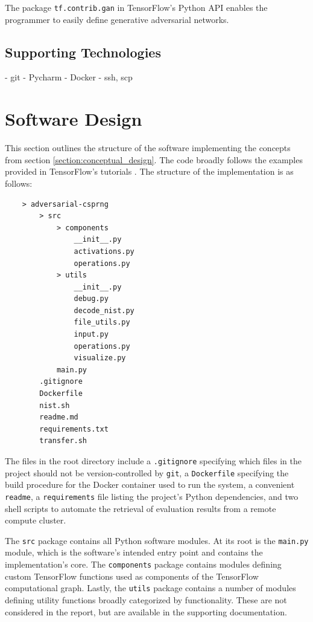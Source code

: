\documentclass[12pt, titlepage]{report}
\theoremstyle{definition}
\begin{document}
The package \texttt{tf.contrib.gan} in TensorFlow's Python API enables the programmer to easily define generative adversarial networks.



\subsection{Supporting Technologies}
- git
- Pycharm
- Docker
- ssh, scp




\section{Software Design}
This section outlines the structure of the software implementing the concepts from section \ref{section:conceptual_design}. The code broadly follows the examples provided in TensorFlow's tutorials \cite{tensorflow2018tutorials} \cite{tensorflow2018tfgan}. The structure of the implementation is as follows:

\begin{verbatim}
    > adversarial-csprng    
        > src
            > components
                __init__.py
                activations.py
                operations.py
            > utils
                __init__.py
                debug.py
                decode_nist.py
                file_utils.py
                input.py
                operations.py
                visualize.py
            main.py
        .gitignore
        Dockerfile
        nist.sh
        readme.md
        requirements.txt
        transfer.sh
\end{verbatim}

The files in the root directory include a \texttt{.gitignore} specifying which files in the project should not be version-controlled by \texttt{git}, a \texttt{Dockerfile} specifying the build procedure for the Docker container used to run the system, a convenient \texttt{readme}, a \texttt{requirements} file listing the project's Python dependencies, and two shell scripts to automate the retrieval of evaluation results from a remote compute cluster.

The \texttt{src} package contains all Python software modules. At its root is the \texttt{main.py} module, which is the software's intended entry point and contains the implementation's core. The \texttt{components} package contains modules defining custom TensorFlow functions used as components of the TensorFlow computational graph. Lastly, the \texttt{utils} package contains a number of modules defining utility functions broadly categorized by functionality. These are not considered in the report, but are available in the supporting documentation.
\end{document}
